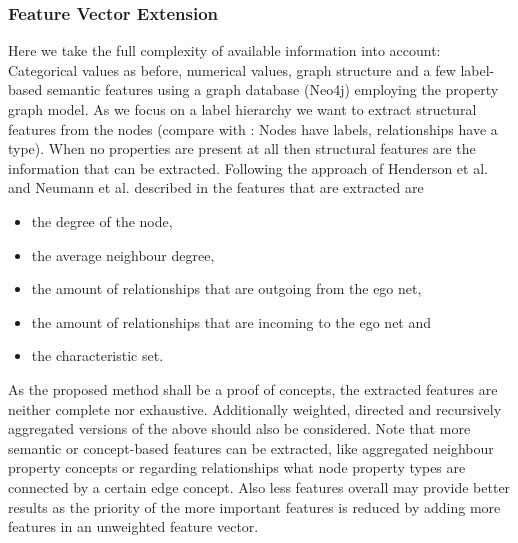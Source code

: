 \subsubsection{Feature Vector Extension}
Here we take the full complexity of available information into account: Categorical values as before, numerical values, graph structure and a few label-based semantic features using a graph database (Neo4j) employing the property graph model.
As we focus on a label hierarchy we want to extract structural features from the nodes (compare with : Nodes have labels, relationships have a type).
When no properties are present at all then structural features are the information that can be extracted. Following the approach of Henderson et al. and Neumann et al. described in  the features that are extracted are
\begin{itemize}
    \item the degree of the node,
    \item the average neighbour degree,
    \item the amount of relationships that are outgoing from the ego net,
    \item the amount of relationships that are incoming to the ego net and
    \item the characteristic set.
\end{itemize}
As the proposed method shall be a proof of concepts, the extracted features are neither complete nor exhaustive. Additionally weighted, directed and recursively aggregated versions of the above should also be considered.
Note that more semantic or concept-based features can be extracted, like aggregated neighbour property concepts or regarding relationships what node property types are connected by a certain edge concept. Also less features overall may provide better results as the priority of the more important features is reduced by adding more features in an unweighted feature vector. \\


